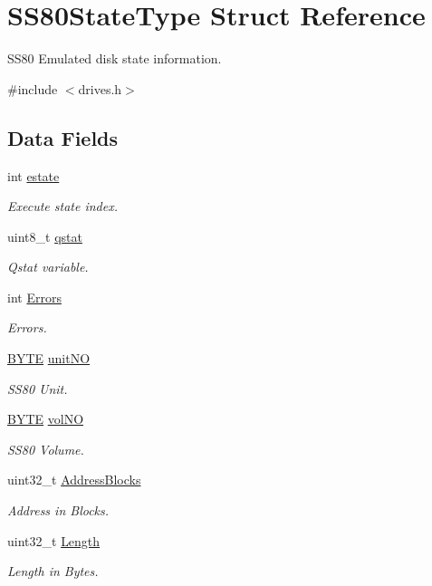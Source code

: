 \hypertarget{structSS80StateType}{}\section{S\+S80\+State\+Type Struct Reference}
\label{structSS80StateType}


S\+S80 Emulated disk state information.  




{\ttfamily \#include $<$drives.\+h$>$}

\subsection*{Data Fields}
\begin{DoxyCompactItemize}
\item 
int \hyperlink{structSS80StateType_ae4a94143cb4201687be4e33684be057e}{estate}
\begin{DoxyCompactList}\small\item\em Execute state index. \end{DoxyCompactList}\item 
uint8\+\_\+t \hyperlink{structSS80StateType_ad4911c7b89ec1ff2c0aa01881b1e3d3a}{qstat}
\begin{DoxyCompactList}\small\item\em Qstat variable. \end{DoxyCompactList}\item 
int \hyperlink{structSS80StateType_a7a5c363c6f617ee457a4daacadb3a7b2}{Errors}
\begin{DoxyCompactList}\small\item\em Errors. \end{DoxyCompactList}\item 
\hyperlink{integer_8h_a4ae1dab0fb4b072a66584546209e7d58}{B\+Y\+TE} \hyperlink{structSS80StateType_ad2b3cd5353f5650df931520a39b385e7}{unit\+NO}
\begin{DoxyCompactList}\small\item\em S\+S80 Unit. \end{DoxyCompactList}\item 
\hyperlink{integer_8h_a4ae1dab0fb4b072a66584546209e7d58}{B\+Y\+TE} \hyperlink{structSS80StateType_ac197866db7677ec4bf9ad5e29e4a58a3}{vol\+NO}
\begin{DoxyCompactList}\small\item\em S\+S80 Volume. \end{DoxyCompactList}\item 
uint32\+\_\+t \hyperlink{structSS80StateType_a6cffa1e36a57bce4188ede4bd9dbd7ad}{Address\+Blocks}
\begin{DoxyCompactList}\small\item\em Address in Blocks. \end{DoxyCompactList}\item 
uint32\+\_\+t \hyperlink{structSS80StateType_a507159f0a0a4f3127488081fd618e8f6}{Length}
\begin{DoxyCompactList}\small\item\em Length in Bytes. \end{DoxyCompactList}\end{DoxyCompactItemize}



